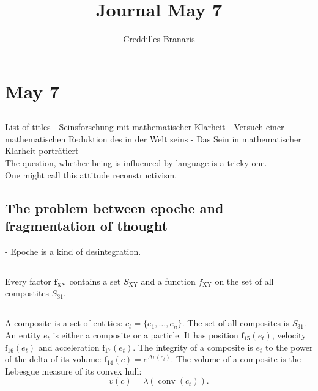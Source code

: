 \documentclass[12pt]{article}
\title{Journal May 7}
\author{Creddilles Branaris}
\begin{document}
\maketitle

\section{May 7}

\subsection{}

List of titles
- Seinsforschung mit mathematischer Klarheit
- Versuch einer mathematischen Reduktion des in der Welt seins
- Das Sein in mathematischer Klarheit porträtiert\\

The question, whether being is influenced by language is a tricky one. \\

One might call this attitude reconstructivism.

\subsection{The problem between epoche and fragmentation of thought}

- Epoche is a kind of desintegration.

\subsection{}

Every factor $\textbf{f}_{\text{XY}}$ contains a set $S_{\text{XY}}$ and a function $f_{\text{XY}}$ on the set of all compostites $S_{31}$. 

\subsection{}

A composite is a set of entities:
\( c_t = \{ e_1, \dots, e_n \}.\)
The set of all composites is $S_{31}$. An entity $e_t$ is either a composite or a particle. It has position $\text{f}_{15}(e_t)$, velocity $\text{f}_{16}(e_t)$ and acceleration $\text{f}_{17}(e_t)$. The integrity of a composite is $e_t$ to the power of the delta of its volume:
\(
\text{f}_{14}(c) = e^{\Delta v(c_t)}.
\)
The volume of a composite is the Lebesgue measure of its convex hull:
\[
v(c) = \lambda(\operatorname{conv}(c_t)).
\]
\end{document}
